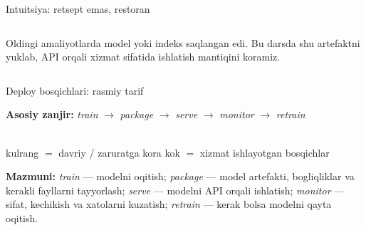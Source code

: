 \documentclass[aspectratio=169,11pt]{beamer}
\newcommand{\uzq}{\textquotesingle{}}   %
\begin{document}
\begin{frame}{Intuitsiya: retsept emas, restoran}
\begin{columns}[T,totalwidth=\textwidth]
\begin{column}{0.47\textwidth}
      \vspace{4pt}

      \begin{tcolorbox}[okbox,top=2pt,bottom=2pt]
        \footnotesize
        Oldingi amaliyotlarda model yoki indeks saqlangan edi.
        Bu darsda shu artefaktni yuklab, API orqali xizmat sifatida ishlatish
        mantiqini ko\uzq{}ramiz.
      \end{tcolorbox}
    \end{column}
  \end{columns}
\end{frame}

\begin{frame}{Deploy bosqichlari: rasmiy ta\uzq{}rif}
  \small

  \begin{tcolorbox}[defbox]
    \centering
    \textbf{Asosiy zanjir:}\qquad
    \textit{train} $\rightarrow$ \textit{package} $\rightarrow$ \textit{serve}
    $\rightarrow$ \textit{monitor} $\rightarrow$ \textit{retrain}
  \end{tcolorbox}

  \vspace{2pt}

  \begin{center}
  \\[2pt]

  {\scriptsize\color{gray!70!black}
   kulrang $=$ davriy / zaruratga ko\uzq{}ra \qquad
   {\color{cnublue}ko\uzq{}k $=$ xizmat ishlayotgan bosqichlar}}
  \end{center}

  \vspace{1pt}

  \footnotesize
  \textbf{Mazmuni:}
  \textit{train} --- modelni o\uzq{}qitish;
  \textit{package} --- model artefakti, bog\uzq{}liqliklar va kerakli fayllarni tayyorlash;
  \textit{serve} --- modelni API orqali ishlatish;
  \textit{monitor} --- sifat, kechikish va xatolarni kuzatish;
  \textit{retrain} --- kerak bo\uzq{}lsa modelni qayta o\uzq{}qitish.
\end{frame}
\end{document}
